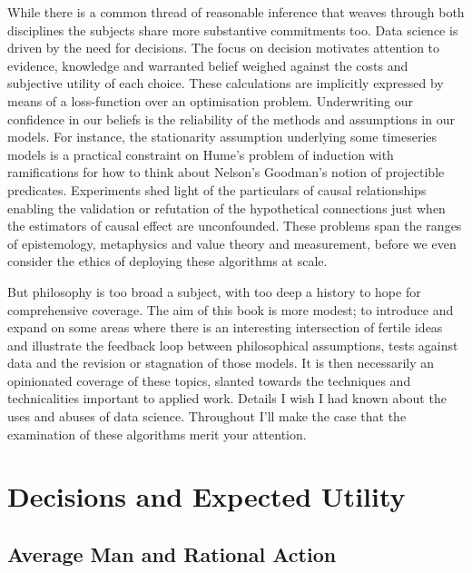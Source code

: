 \documentclass[]{tufte-book}
\theoremstyle{definition}
\theoremstyle{definition}
\theoremstyle{definition}
\theoremstyle{remark}
\begin{document}
While there is a common thread of reasonable inference that weaves through both disciplines the subjects share more substantive commitments too. Data science is driven by the need for decisions. The focus on decision motivates attention to evidence, knowledge and warranted belief weighed against the costs and subjective utility of each choice. These calculations are implicitly expressed by means of a loss-function over an optimisation problem. Underwriting our confidence in our beliefs is the reliability of the methods and assumptions in our models. For instance, the stationarity assumption underlying some timeseries models is a practical constraint on Hume's problem of induction with ramifications for how to think about Nelson's Goodman's notion of projectible predicates. Experiments shed light of the particulars of causal relationships enabling the validation or refutation of the hypothetical connections just when the estimators of causal effect are unconfounded. These problems span the ranges of epistemology, metaphysics and value theory and measurement, before we even consider the ethics of deploying these algorithms at scale.

But philosophy is too broad a subject, with too deep a history to hope for comprehensive coverage. The aim of this book is more modest; to introduce and expand on some areas where there is an interesting intersection of fertile ideas and illustrate the feedback loop between philosophical assumptions, tests against data and the revision or stagnation of those models. It is then necessarily an opinionated coverage of these topics, slanted towards the techniques and technicalities important to applied work. Details I wish I had known about the uses and abuses of data science. Throughout I'll make the case that the examination of these algorithms merit your attention.

\hypertarget{decisions-and-expected-utility}{%
\chapter{Decisions and Expected Utility}\label{decisions-and-expected-utility}}

\hypertarget{average-man-and-rational-action}{%
\section{Average Man and Rational Action}\label{average-man-and-rational-action}}
\end{document}
